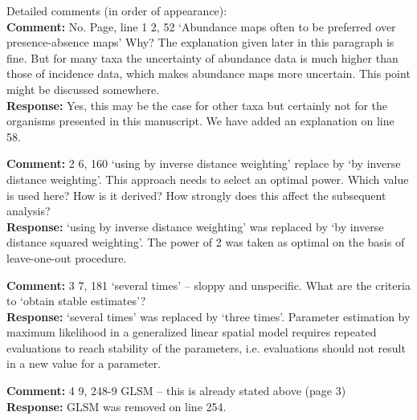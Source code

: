 \documentclass{letter}
\begin{document}
\begin{letter}
Detailed comments (in order of appearance):\\

\textbf{Comment:} 
No. Page, line 1 2, 52 `Abundance maps often to be preferred over presence-absence maps' Why? The explanation given later in this paragraph is fine. But for many taxa the uncertainty of abundance data is much higher than those of incidence data, which makes abundance maps more uncertain. This point might be discussed somewhere.\\
\textbf{Response:} Yes, this may be the case for other taxa but certainly not for the organisms presented in this manuscript. We have added an explanation on line 58.

\textbf{Comment:} 
2 6, 160 `using by inverse distance weighting' replace by `by inverse distance weighting'. This approach needs to select an optimal power. Which value is used here? How is it derived? How strongly does this affect the subsequent analysis?\\
\textbf{Response:} `using by inverse distance weighting' was replaced by  `by inverse distance squared weighting'.  The power of 2 was taken as optimal on the basis of leave-one-out procedure.

\textbf{Comment:} 
 3 7, 181 `several times' -- sloppy and unspecific. What are the criteria to `obtain stable estimates'?\\
\textbf{Response:} `several times' was replaced by `three times'. Parameter estimation by maximum likelihood in a generalized linear spatial model requires 
repeated evaluations to reach stability of the parameters, i.e. evaluations should not result in a new value for a parameter.  

\textbf{Comment:} 
 4 9, 248-9
 GLSM -- this is already stated above (page 3)\\
 \textbf{Response:} GLSM was removed on line 254.


\end{letter}
\end{document}
